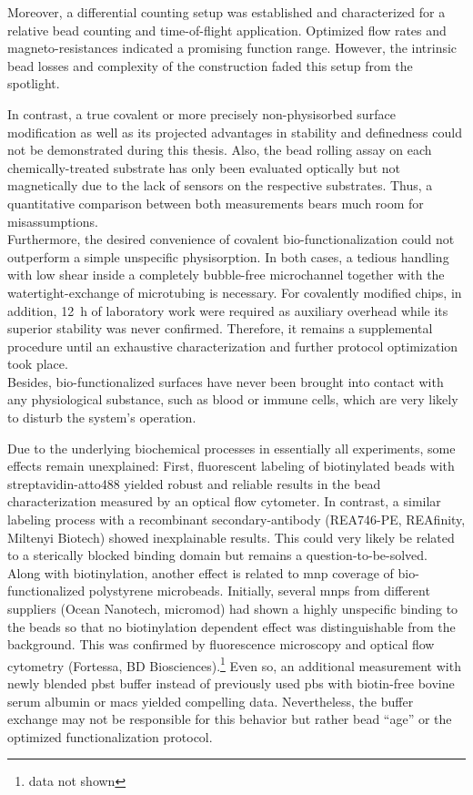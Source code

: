 Moreover, a differential counting setup was established and characterized for a relative bead counting and time-of-flight application. Optimized flow rates and magneto-resistances indicated a promising function range. However, the intrinsic bead losses and complexity of the construction faded this setup from the spotlight. 

In contrast, a true covalent or more precisely non-physisorbed surface modification as well as its projected advantages in stability and definedness could not be demonstrated during this thesis. Also, the bead rolling assay on each chemically-treated substrate has only been evaluated optically but not magnetically due to the lack of sensors on the respective substrates. Thus, a quantitative comparison between both measurements bears much room for misassumptions.\\
Furthermore, the desired convenience of covalent bio-functionalization could not outperform a simple unspecific physisorption. In both cases, a tedious handling with low shear inside a completely bubble-free microchannel together with the watertight-exchange of microtubing is necessary. For covalently modified chips, in addition, \SI{12}{\hour} of laboratory work were required as auxiliary overhead while its superior stability was never confirmed. Therefore, it remains a supplemental procedure until an exhaustive characterization and further protocol optimization took place.\\
Besides, bio-functionalized surfaces have never been brought into contact with any physiological substance, such as blood or immune cells, which are very likely to disturb the system's operation.

Due to the underlying biochemical processes in essentially all experiments, some effects remain unexplained: First, fluorescent labeling of biotinylated beads with strept\-avidin-atto488 yielded robust and reliable results in the bead characterization measured by an optical flow cytometer. In contrast, a similar labeling process with a recombinant secondary-antibody (REA746-PE, REAfinity, Miltenyi Biotech) showed inexplainable results. This could very likely be related to a sterically blocked binding domain but remains a question-to-be-solved.\\
Along with biotinylation, another effect is related to \gls{mnp} coverage of bio-functionalized polystyrene microbeads. Initially, several \glspl{mnp} from different suppliers (Ocean Nanotech, micromod) had shown a highly unspecific binding to the beads so that no biotinylation dependent effect was distinguishable from the background. This was confirmed by fluorescence microscopy and optical flow cytometry (Fortessa, BD Biosciences).\footnote{data not shown} Even so, an additional measurement with newly blended \gls{pbst} buffer instead of previously used \gls{pbs} with biotin-free bovine serum albumin or \gls{macs} yielded compelling data. Nevertheless, the buffer exchange may not be responsible for this behavior but rather bead ``age'' or the optimized functionalization protocol.

